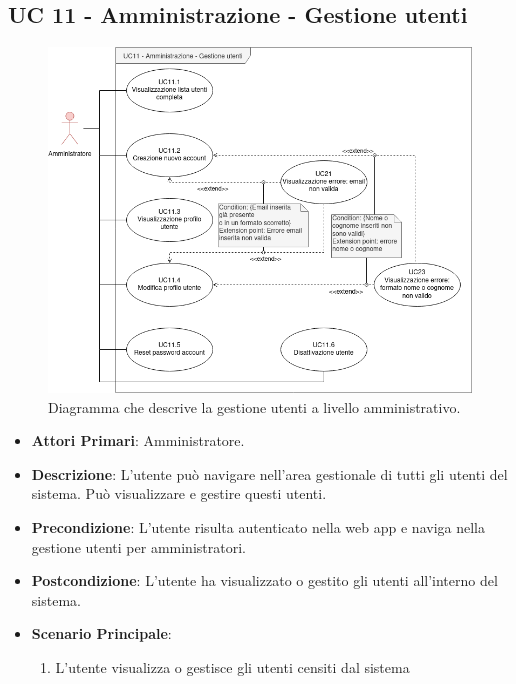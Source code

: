 \subsection{UC 11 - Amministrazione - Gestione utenti}

		\begin{figure}[H]
			\centering
			\includegraphics[scale=0.60]{res/images/uc11}
			\caption{Diagramma che descrive la gestione utenti a livello amministrativo.}
		\end{figure}

		\begin{itemize}
			\item \textbf{Attori Primari}: Amministratore.
			\item \textbf{Descrizione}: L'utente può navigare nell'area gestionale di tutti gli utenti del sistema. Può visualizzare e gestire questi utenti. 
			\item \textbf{Precondizione}: L'utente risulta autenticato nella web app e naviga nella gestione utenti per amministratori.
			\item \textbf{Postcondizione}: L'utente ha visualizzato o gestito gli utenti all'interno del sistema. 
			\item \textbf{Scenario Principale}:
			\begin{enumerate}
				\item{L'utente visualizza o gestisce gli utenti censiti dal sistema}
			\end{enumerate}	
		\end{itemize}

